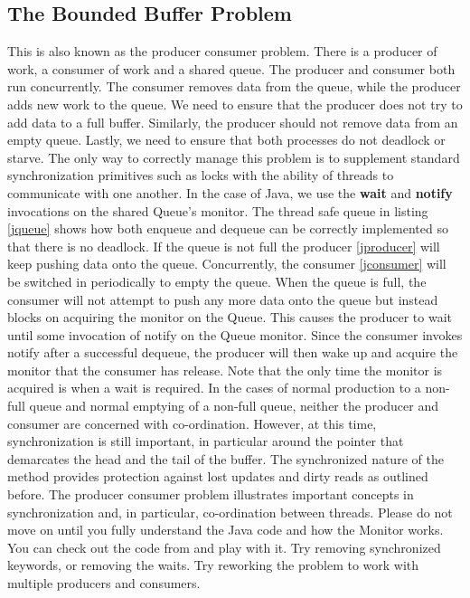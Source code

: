 \documentclass[10pt,a4paper]{article}
\begin{document}
\subsection{The Bounded Buffer Problem}
This is also known as the producer consumer problem. There is a producer of work, a consumer of work and a shared queue. The producer and consumer both run concurrently. The consumer removes data from the queue, while the producer adds new work to the queue. We need to ensure that the producer does not try to add data to a full buffer. Similarly, the producer should not remove data from an empty queue. Lastly, we need to ensure that both processes do not deadlock or starve. The only way to correctly manage this problem is to supplement standard synchronization primitives such as locks with the ability of threads to communicate with one another. In the case of Java, we use the {\bf wait} and {\bf notify} invocations on the shared Queue's monitor. The thread safe queue in listing \ref{jqueue} shows how both enqueue and dequeue can be correctly implemented so that there is no deadlock. If the queue is not full the producer \ref{jproducer} will keep pushing data onto the queue. Concurrently, the consumer \ref{jconsumer} will be switched in periodically to empty the queue. When the queue is full, the consumer will not attempt to push any more data onto the queue but instead blocks on acquiring the monitor on the Queue. This causes the producer to wait until some invocation of notify on the Queue monitor. Since the consumer invokes notify after a successful dequeue, the producer will then wake up and acquire the monitor that the consumer has release. Note that the only time the monitor is acquired is when a wait is required. In the cases of normal production to a non-full queue and normal emptying of a non-full queue, neither the producer and consumer are concerned with co-ordination. However, at this time, synchronization is still important, in particular around the pointer that demarcates the head and the tail of the buffer. The synchronized nature of the method provides protection against lost updates and dirty reads as outlined before. 
\newline\newline
The producer consumer problem illustrates important concepts in synchronization and, in particular, co-ordination between threads. Please do not move on until you fully understand the Java code and how the Monitor works. You can check out the code from \cite{GITHUB} and play with it. Try removing synchronized keywords, or removing the waits. Try reworking the problem to work with multiple producers and consumers. 
\end{document}
